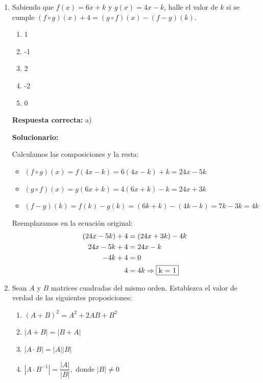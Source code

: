 \begin{enumerate}[resume]
	
	
	\item Sabiendo que $f(x) = 6x + k$ y $g(x) = 4x - k$, halle el valor de $k$ si se cumple $(f \circ g)(x) + 4 = (g \circ f)(x) - (f - g)(k)$.
	
	\begin{enumerate}[label=\alph*)]
		\item 1
		\item -1
		\item 2
		\item -2
		\item 0
	\end{enumerate}
	
	\textbf{Respuesta correcta:} a)
	
	\vspace{2mm}
	\textbf{Solucionario:}
	
	Calculamos las composiciones y la resta:
	\begin{itemize}
		\item $(f \circ g)(x) = f(4x - k) = 6(4x - k) + k = 24x - 5k$
		\item $(g \circ f)(x) = g(6x + k) = 4(6x + k) - k = 24x + 3k$
		\item $(f - g)(k) = f(k) - g(k) = (6k + k) - (4k - k) = 7k - 3k = 4k$
	\end{itemize}
	Reemplazamos en la ecuación original:
	\begin{align*}
		(24x - 5k) + 4 &= (24x + 3k) - 4k \\
		24x - 5k + 4 &= 24x - k \\
		-4k + 4 &= 0 \\
		4 &= 4k \Rightarrow \fbox{k = 1}
	\end{align*}
	
	
	
	
	
	\vspace{6mm}
	
	
	
	
	\item Sean $A$ y $B$ matrices cuadradas del mismo orden. Establezca el valor de verdad de las siguientes proposiciones:
	\begin{enumerate}[label=\Roman*.]
		\item $(A + B)^2 = A^2 + 2AB + B^2$
		\item $|A + B| = |B + A|$
		\item $|A \cdot B| = |A| |B|$
		\item $|A \cdot B^{-1}| =\displaystyle \dfrac{|A|}{|B|}, \text{ donde } |B| \neq 0$
	\end{enumerate}
	

\end{enumerate}
